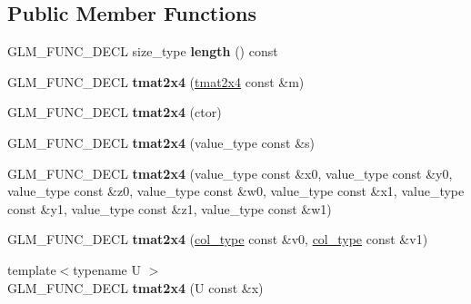 \subsection*{\-Public \-Member \-Functions}
\begin{DoxyCompactItemize}
\item 
\hypertarget{structglm_1_1detail_1_1tmat2x4_aa080de612085192981fe9d814fd7ddd7}{\-G\-L\-M\-\_\-\-F\-U\-N\-C\-\_\-\-D\-E\-C\-L size\-\_\-type {\bfseries length} () const }\label{structglm_1_1detail_1_1tmat2x4_aa080de612085192981fe9d814fd7ddd7}

\item 
\hypertarget{structglm_1_1detail_1_1tmat2x4_ae82c79b06f81d05896740f1f2c2795de}{\-G\-L\-M\-\_\-\-F\-U\-N\-C\-\_\-\-D\-E\-C\-L {\bfseries tmat2x4} (\hyperlink{structglm_1_1detail_1_1tmat2x4}{tmat2x4} const \&m)}\label{structglm_1_1detail_1_1tmat2x4_ae82c79b06f81d05896740f1f2c2795de}

\item 
\hypertarget{structglm_1_1detail_1_1tmat2x4_ac0fb677645f6a217a555408a7005b318}{\-G\-L\-M\-\_\-\-F\-U\-N\-C\-\_\-\-D\-E\-C\-L {\bfseries tmat2x4} (ctor)}\label{structglm_1_1detail_1_1tmat2x4_ac0fb677645f6a217a555408a7005b318}

\item 
\hypertarget{structglm_1_1detail_1_1tmat2x4_ac408581b742a59fb16a6e800ef6bdc5f}{\-G\-L\-M\-\_\-\-F\-U\-N\-C\-\_\-\-D\-E\-C\-L {\bfseries tmat2x4} (value\-\_\-type const \&s)}\label{structglm_1_1detail_1_1tmat2x4_ac408581b742a59fb16a6e800ef6bdc5f}

\item 
\hypertarget{structglm_1_1detail_1_1tmat2x4_acbba6d5443699632d8aa730077fdc538}{\-G\-L\-M\-\_\-\-F\-U\-N\-C\-\_\-\-D\-E\-C\-L {\bfseries tmat2x4} (value\-\_\-type const \&x0, value\-\_\-type const \&y0, value\-\_\-type const \&z0, value\-\_\-type const \&w0, value\-\_\-type const \&x1, value\-\_\-type const \&y1, value\-\_\-type const \&z1, value\-\_\-type const \&w1)}\label{structglm_1_1detail_1_1tmat2x4_acbba6d5443699632d8aa730077fdc538}

\item 
\hypertarget{structglm_1_1detail_1_1tmat2x4_a0cf8f30e8d54baddb57f4091e27f30df}{\-G\-L\-M\-\_\-\-F\-U\-N\-C\-\_\-\-D\-E\-C\-L {\bfseries tmat2x4} (\hyperlink{structglm_1_1detail_1_1tvec4}{col\-\_\-type} const \&v0, \hyperlink{structglm_1_1detail_1_1tvec4}{col\-\_\-type} const \&v1)}\label{structglm_1_1detail_1_1tmat2x4_a0cf8f30e8d54baddb57f4091e27f30df}

\item 
\hypertarget{structglm_1_1detail_1_1tmat2x4_a03f772ad4ebee440631b9cb0a738ac28}{{\footnotesize template$<$typename U $>$ }\\\-G\-L\-M\-\_\-\-F\-U\-N\-C\-\_\-\-D\-E\-C\-L {\bfseries tmat2x4} (\-U const \&x)}\label{structglm_1_1detail_1_1tmat2x4_a03f772ad4ebee440631b9cb0a738ac28}


\end{DoxyCompactItemize}
